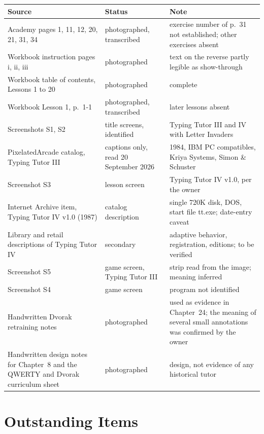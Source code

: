 \begin{center}
\begin{tabular}{@{}p{4.4cm}p{3.2cm}p{4.2cm}@{}}
\toprule
Source & Status & Note \\
\midrule
Academy pages 1, 11, 12, 20, 21, 31, 34 & photographed, transcribed & exercise number of p.~31 not established; other exercises absent \\
Workbook instruction pages i, ii, iii & photographed & text on the reverse partly legible as show-through \\
Workbook table of contents, Lessons 1 to 20 & photographed & complete \\
Workbook Lesson 1, p.~1-1 & photographed, transcribed & later lessons absent \\
Screenshots S1, S2 & title screens, identified & Typing Tutor III and IV with Letter Invaders \\
PixelatedArcade catalog, Typing Tutor III & captions only, read 20 September 2026 & 1984, IBM PC compatibles, Kriya Systems, Simon \& Schuster \\
Screenshot S3 & lesson screen & Typing Tutor IV v1.0, per the owner \\
Internet Archive item, Typing Tutor IV v1.0 (1987) & catalog description & single 720K disk, DOS, start file tt.exe; date-entry caveat \\
Library and retail descriptions of Typing Tutor IV & secondary & adaptive behavior, registration, editions; to be verified \\
Screenshot S5 & game screen, Typing Tutor III & strip read from the image; meaning inferred \\
Screenshot S4 & game screen & program not identified \\
Handwritten Dvorak retraining notes & photographed & used as evidence in Chapter~24; the meaning of several small annotations was confirmed by the owner \\
Handwritten design notes for Chapter~8 and the QWERTY and Dvorak curriculum sheet & photographed & design, not evidence of any historical tutor \\
\bottomrule
\end{tabular}
\end{center}

\section*{Outstanding Items}


